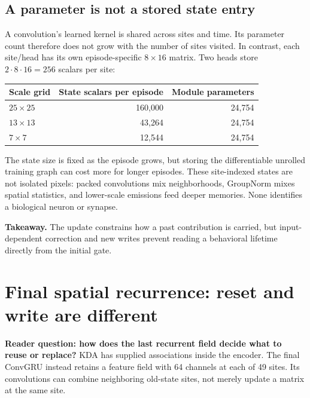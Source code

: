 \documentclass[10pt,letterpaper]{article}
\newcommand{\takeaway}[1]{\par\smallskip\noindent\textbf{Takeaway.} #1}
\newcommand{\psection}[1]{\clearpage\section{#1}}
\begin{document}
\subsection{A parameter is not a stored state entry}
A convolution's learned kernel is shared across sites and time. Its parameter count therefore does not grow with the number of sites visited. In contrast, each site/head has its own episode-specific $8\times16$ matrix. Two heads store $2\cdot8\cdot16=256$ scalars per site:
\begin{center}
\begin{tabular}{@{}lrr@{}}\toprule
Scale grid & State scalars per episode & Module parameters\\\midrule
$25\times25$ &160,000&24,754\\
$13\times13$ &43,264&24,754\\
$7\times7$ &12,544&24,754\\\bottomrule
\end{tabular}
\end{center}
The state size is fixed as the episode grows, but storing the differentiable unrolled training graph can cost more for longer episodes. These site-indexed states are not isolated pixels: packed convolutions mix neighborhoods, GroupNorm mixes spatial statistics, and lower-scale emissions feed deeper memories. None identifies a biological neuron or synapse.
\takeaway{The update constrains how a past contribution is carried, but input-dependent correction and new writes prevent reading a behavioral lifetime directly from the initial gate.}

\psection{Final spatial recurrence: reset and write are different}
\textbf{Reader question: how does the last recurrent field decide what to reuse or replace?}
KDA has supplied associations inside the encoder. The final ConvGRU instead retains a feature field with 64 channels at each of 49 sites. Its convolutions can combine neighboring old-state sites, not merely update a matrix at the same site.
\end{document}
